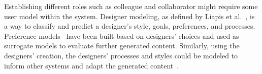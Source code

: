 

Establishing different roles such as colleague and collaborator might require some user model within the system. Designer modeling, as defined by Liapis et al.~, is a way to classify and predict a designer's style, goals, preferences, and processes. Preference models~ have been built based on designers' choices and used as surrogate models to evaluate further generated content. Similarly, using the designers' creation, the designers' processes and styles could be modeled to inform other systems and adapt the generated content~.





